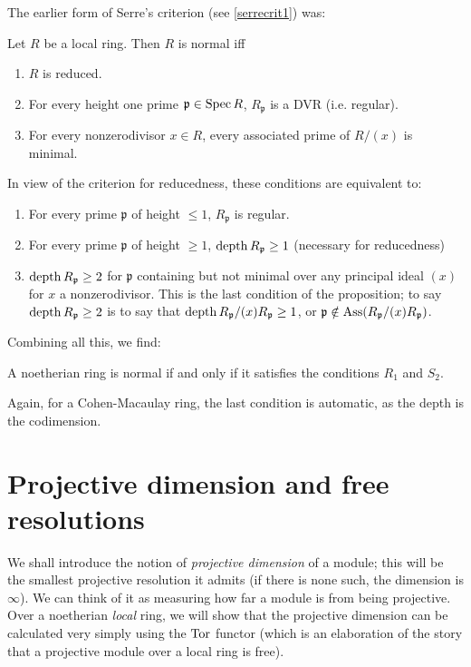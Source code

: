 The earlier form of Serre's criterion (see \cref{serrecrit1}) was:
\begin{proposition}
Let $R$ be a local ring.
Then $R$ is normal iff
\begin{enumerate}
\item  $R$ is reduced.
\item For every height one prime $\mathfrak{p}  \in \operatorname{Spec} R$,
$R_{\mathfrak{p}}$ is a DVR (i.e. regular).
\item For every nonzerodivisor $x \in R$, every associated prime
of $R/(x)$ is
minimal.
\end{enumerate}
\end{proposition}
In view of the criterion for reducedness, these conditions are equivalent to:
\begin{enumerate}
\item For every prime $\mathfrak{p}$ of height $\leq 1$,
$R_{\mathfrak{p}} $ is regular.
\item For every prime $\mathfrak{p}$ of height $\geq 1$,
$\operatorname{depth} R_{\mathfrak{p}} \geq 1$ (necessary for reducedness)
\item $\operatorname{depth} R_{\mathfrak{p}} \geq 2$ for $\mathfrak{p}$ containing but not
minimal over any
principal ideal $(x)$ for $x$ a nonzerodivisor. This 
is the last
condition of the proposition; to say $\operatorname{depth} R_{\mathfrak{p}} \geq 2$ is to
say that $\operatorname{depth} R_{\mathfrak{p}}/(x)R_{\mathfrak{p}} \geq 1$, or
$\mathfrak{p} \notin
\operatorname{Ass}(R_{\mathfrak{p}}/(x)R_{\mathfrak{p}})$.
\end{enumerate}

Combining all this, we find:
\begin{theorem} A noetherian ring is normal
if and only if it satisfies the conditions $R_1$ and $S_2$.
\end{theorem}

Again, for a Cohen-Macaulay ring, the last condition is automatic, as
the depth is the
codimension.

\section{Projective dimension and free resolutions}

We shall introduce the notion of \emph{projective dimension} of a module; this
will be the smallest projective resolution it admits (if there is none such,
the dimension is $\infty$). We can think of it as measuring how far a module is
from being projective. Over a noetherian \emph{local} ring, we will show that
the projective dimension can be calculated very simply using the $\operatorname{Tor}$ functor
(which is an elaboration of the story that a projective module over a local
ring is free).

